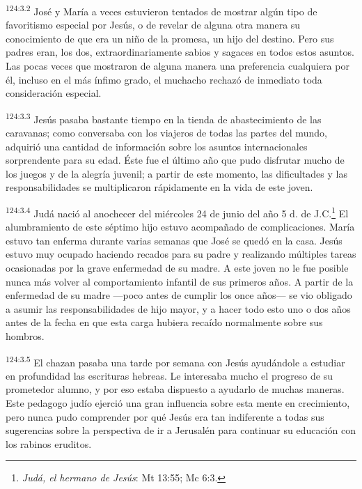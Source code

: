 \par 
\textsuperscript{124:3.2} José y María a veces estuvieron tentados de mostrar algún tipo de favoritismo especial por Jesús, o de revelar de alguna otra manera su conocimiento de que era un niño de la promesa, un hijo del destino. Pero sus padres eran, los dos, extraordinariamente sabios y sagaces en todos estos asuntos. Las pocas veces que mostraron de alguna manera una preferencia cualquiera por él, incluso en el más ínfimo grado, el muchacho rechazó de inmediato toda consideración especial.

\par 
\textsuperscript{124:3.3} Jesús pasaba bastante tiempo en la tienda de abastecimiento de las caravanas; como conversaba con los viajeros de todas las partes del mundo, adquirió una cantidad de información sobre los asuntos internacionales sorprendente para su edad. Éste fue el último año que pudo disfrutar mucho de los juegos y de la alegría juvenil; a partir de este momento, las dificultades y las responsabilidades se multiplicaron rápidamente en la vida de este joven.

\par 
\textsuperscript{124:3.4} Judá nació al anochecer del miércoles 24 de junio del año 5 d. de J.C.\footnote{\textit{Judá, el hermano de Jesús}: Mt 13:55; Mc 6:3.} El alumbramiento de este séptimo hijo estuvo acompañado de complicaciones. María estuvo tan enferma durante varias semanas que José se quedó en la casa. Jesús estuvo muy ocupado haciendo recados para su padre y realizando múltiples tareas ocasionadas por la grave enfermedad de su madre. A este joven no le fue posible nunca más volver al comportamiento infantil de sus primeros años. A partir de la enfermedad de su madre ---poco antes de cumplir los once años--- se vio obligado a asumir las responsabilidades de hijo mayor, y a hacer todo esto uno o dos años antes de la fecha en que esta carga hubiera recaído normalmente sobre sus hombros.

\par 
\textsuperscript{124:3.5} El chazan pasaba una tarde por semana con Jesús ayudándole a estudiar en profundidad las escrituras hebreas. Le interesaba mucho el progreso de su prometedor alumno, y por eso estaba dispuesto a ayudarlo de muchas maneras. Este pedagogo judío ejerció una gran influencia sobre esta mente en crecimiento, pero nunca pudo comprender por qué Jesús era tan indiferente a todas sus sugerencias sobre la perspectiva de ir a Jerusalén para continuar su educación con los rabinos eruditos.

